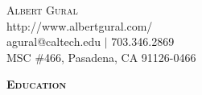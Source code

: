\documentclass{article}
\newenvironment{changemargin}[2]{%
  \begin{list}{}{%
    \setlength{\topsep}{0pt}%
    \setlength{\leftmargin}{#1}%
    \setlength{\rightmargin}{#2}%
    \setlength{\listparindent}{\parindent}%
    \setlength{\itemindent}{\parindent}%
    \setlength{\parsep}{\parskip}%
  }%
  \item[]}{\end{list}
}
\newcommand{\lineover}{
	\begin{changemargin}{-0.05in}{-0.05in}
		\vspace*{-8pt}
		\hrulefill \\
		\vspace*{-2pt}
	\end{changemargin}
}
\newcommand{\header}[1]{
	\begin{changemargin}{-0.5in}{-0.5in}
		{\large \textbf{\scshape{#1}}}\\
  	\lineover
	\end{changemargin}
}
\newcommand\textline[4][t]{%
  \par\smallskip\noindent\parbox[#1]{.3\textwidth}{\raggedright#2}%
  \parbox[#1]{.4\textwidth}{\centering#3}%
  \parbox[#1]{.3\textwidth}{\raggedleft#4}\par\smallskip%
}
\begin{document}
\begin{changemargin}{0.5in}{0.5in}
	\begin{center}
		{\huge \scshape {Albert Gural}}\\ \smallskip
		{http://www.albertgural.com/}\\ \smallskip
		{\small agural@caltech.edu $|$ 703.346.2869}\\
		{\footnotesize MSC \#466, Pasadena, CA 91126-0466}
	\end{center}
\end{changemargin}


\header{Education}
\end{document}

